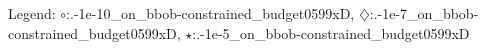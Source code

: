 Legend: {\color{NavyBlue}$\circ$}:.\cobyla-1e-10\_on\_bbob-constrained\_budget0599xD, {\color{Magenta}$\diamondsuit$}:.\cobyla-1e-7\_on\_bbob-constrained\_budget0599xD, {\color{Orange}$\star$}:.\cobyla-1e-5\_on\_bbob-constrained\_budget0599xD